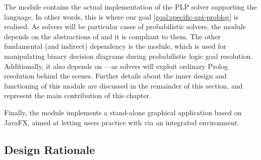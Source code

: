 \documentclass[12pt,a4paper,openright,twoside]{book}
\begin{document}
The  module contains the actual implementation of the PLP solver supporting the \problog{} language.
%
In other words, this is where our goal \ref{goal:specific-api-problog} is realised.
%
As \problog{} solvers will be particular cases of probabilistic solvers, the  module depends on the abstractions of  and it is compliant to them.
%
The other fundamental (and indirect) dependency is the  module, which is used for manipulating binary decision diagrams during probabilistic logic goal resolution.
%
Additionally, it also depends on ---as \problog{} solvers will exploit ordinary Prolog resolution behind the scenes.
%
Further details about the inner design and functioning of this module are discussed in the remainder of this section, and represent the main contribution of this chapter.

Finally, the  module implements a stand-alone graphical application based on JavaFX, aimed at letting \twopkt{} users practice with \problog{} via an integrated environment.


\subsection{Design Rationale}
\end{document}
